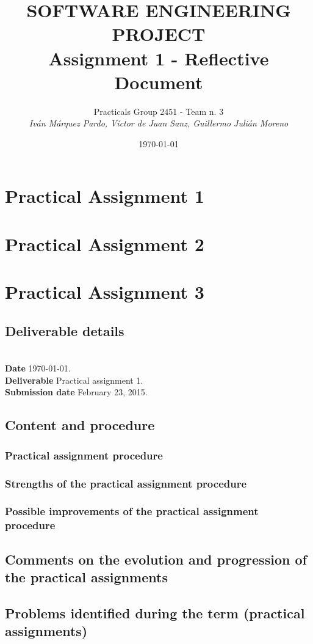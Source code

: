 \documentclass{report}
\title{SOFTWARE ENGINEERING PROJECT\\Assignment 1 - Reflective Document}
\date{\today}
\author{Practicals Group 2451 - Team n. 3 \\ \vspace{5pt} \textit{Iván Márquez Pardo, Víctor de Juan Sanz, Guillermo Julián Moreno}}
\newcommand{\header}[1]{\\ \indent \textbf{#1}\hspace{10pt}}
\begin{document}
\maketitle
\pagestyle{plain}
\chapter{Practical Assignment 1}

\chapter{Practical Assignment 2}

\chapter{Practical Assignment 3}


\section{Deliverable details}

\noindent
\header{Date} \today.
\header{Deliverable} Practical assignment 1.
\header{Submission date} February 23, 2015.

\section{Content and procedure}
\subsection{Practical assignment procedure}
\subsection{Strengths of the practical assignment procedure}
\subsection{Possible improvements of the practical assignment procedure}
\section{Comments on the evolution and progression of the practical assignments}
\section{Problems identified during the term (practical assignments)}
\end{document}
